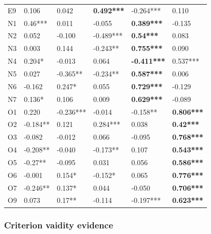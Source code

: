 \documentclass[,man,floatsintext]{apa6}
\theoremstyle{definition}
\theoremstyle{definition}
\theoremstyle{definition}
\theoremstyle{remark}
\begin{document}
\begin{table}[ht]
\begin{tabular}{llllll}
  E9 & 0.106 & 0.042 & \textbf{0.492***} & -0.264*** & 0.110 \\ 
  N1 & 0.46*** & 0.011 & -0.055 & \textbf{0.389***} & -0.135 \\ 
  N2 & 0.052 & -0.100 & -0.489*** & \textbf{0.54***} & 0.083 \\ 
  N3 & 0.003 & 0.144 & -0.243** & \textbf{0.755***} & 0.090 \\ 
  N4 & 0.204* & -0.013 & 0.064 & \textbf{-0.411***} & 0.537*** \\ 
  N5 & 0.027 & -0.365** & -0.234** & \textbf{0.587***} & 0.006 \\ 
  N6 & -0.162 & 0.247* & 0.055 & \textbf{0.729***} & -0.129 \\ 
  N7 & 0.136* & 0.106 & 0.009 & \textbf{0.629***} & -0.089 \\ 
  O1 & 0.220 & -0.236*** & -0.014 & -0.158** & \textbf{0.806***} \\ 
  O2 & -0.184** & 0.121 & 0.284*** & 0.038 & \textbf{0.42***} \\ 
  O3 & -0.082 & -0.012 & 0.066 & -0.095 & \textbf{0.768***} \\ 
  O4 & -0.208** & -0.040 & -0.173** & 0.107 & \textbf{0.543***} \\ 
  O5 & -0.27** & -0.095 & 0.031 & 0.056 & \textbf{0.586***} \\ 
  O6 & -0.001 & 0.154* & -0.152* & 0.065 & \textbf{0.776***} \\ 
  O7 & -0.246** & 0.137* & 0.044 & -0.050 & \textbf{0.706***} \\ 
  O9 & 0.073 & 0.17** & -0.114 & -0.197*** & \textbf{0.623***} \\ 
   \hline
\end{tabular}
\endgroup
\end{table}

\hypertarget{criterion-vaidity-evidence}{%
\subsubsection{Criterion vaidity
evidence}\label{criterion-vaidity-evidence}}
\end{document}
